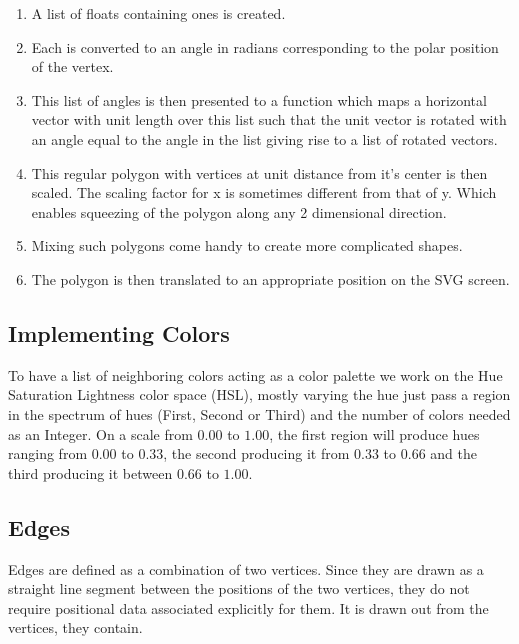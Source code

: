 \begin{enumerate}
\item A list of floats containing ones is created. 

\item Each is converted to an angle in radians corresponding
to the polar position of the vertex. 

\item This list of angles is then presented to
a function which maps a horizontal vector with unit length over this list
such that the unit vector is rotated with an angle equal to the angle in the
list giving rise to a list of rotated vectors.

\item This regular polygon with vertices at unit distance from it's center is
then scaled. The scaling factor for x is sometimes different from that of y.
Which enables squeezing of the polygon along any 2 dimensional direction.

\item Mixing such polygons come handy to create more complicated shapes.

\item The polygon is then translated to an appropriate position on the SVG screen.

\end{enumerate}

\subsection{Implementing Colors}
To have a list of neighboring colors acting as a color palette we work on the
Hue Saturation Lightness color space (HSL), mostly varying the hue just pass a
region in the spectrum of hues (First, Second or Third) and the number of
colors needed as an Integer. On a scale from $0.00$ to $1.00$, the first region
will produce hues ranging from $0.00$ to $0.33$, the second producing it from
$0.33$ to $0.66$ and the third producing it between $0.66$ to $1.00$.

\subsection{Edges}
Edges are defined as a combination of two vertices. Since they are drawn as a
straight line segment between the positions of the two vertices, they do not require
positional data associated explicitly for them. It is drawn out from the vertices,
they contain.

